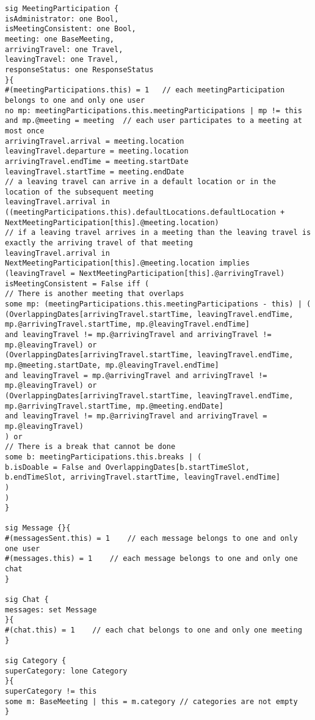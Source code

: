 \begin{lstlisting}[style=alloy]
sig MeetingParticipation {
isAdministrator: one Bool,
isMeetingConsistent: one Bool,
meeting: one BaseMeeting,
arrivingTravel: one Travel,
leavingTravel: one Travel,
responseStatus: one ResponseStatus
}{
#(meetingParticipations.this) = 1	// each meetingParticipation belongs to one and only one user
no mp: meetingParticipations.this.meetingParticipations | mp != this and mp.@meeting = meeting	// each user participates to a meeting at most once
arrivingTravel.arrival = meeting.location
leavingTravel.departure = meeting.location
arrivingTravel.endTime = meeting.startDate
leavingTravel.startTime = meeting.endDate
// a leaving travel can arrive in a default location or in the location of the subsequent meeting
leavingTravel.arrival in ((meetingParticipations.this).defaultLocations.defaultLocation + NextMeetingParticipation[this].@meeting.location)
// if a leaving travel arrives in a meeting than the leaving travel is exactly the arriving travel of that meeting
leavingTravel.arrival in NextMeetingParticipation[this].@meeting.location implies 
(leavingTravel = NextMeetingParticipation[this].@arrivingTravel)
isMeetingConsistent = False iff (
// There is another meeting that overlaps
some mp: (meetingParticipations.this.meetingParticipations - this) | ( 
(OverlappingDates[arrivingTravel.startTime, leavingTravel.endTime, mp.@arrivingTravel.startTime, mp.@leavingTravel.endTime] 
and leavingTravel != mp.@arrivingTravel and arrivingTravel != mp.@leavingTravel) or
(OverlappingDates[arrivingTravel.startTime, leavingTravel.endTime, mp.@meeting.startDate, mp.@leavingTravel.endTime] 
and leavingTravel = mp.@arrivingTravel and arrivingTravel != mp.@leavingTravel) or
(OverlappingDates[arrivingTravel.startTime, leavingTravel.endTime, mp.@arrivingTravel.startTime, mp.@meeting.endDate] 
and leavingTravel != mp.@arrivingTravel and arrivingTravel = mp.@leavingTravel)
) or
// There is a break that cannot be done
some b: meetingParticipations.this.breaks | (
b.isDoable = False and OverlappingDates[b.startTimeSlot, b.endTimeSlot, arrivingTravel.startTime, leavingTravel.endTime]
)
)
}

sig Message {}{
#(messagesSent.this) = 1	// each message belongs to one and only one user
#(messages.this) = 1	// each message belongs to one and only one chat
}

sig Chat {
messages: set Message
}{
#(chat.this) = 1	// each chat belongs to one and only one meeting
}

sig Category {
superCategory: lone Category
}{
superCategory != this
some m: BaseMeeting | this = m.category // categories are not empty
}


\end{lstlisting}
